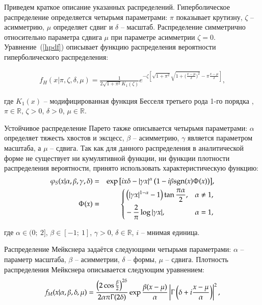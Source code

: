 Приведем краткое описание указанных распределений.
Гиперболическое распределение определяется четырьмя параметрами: $\pi$ показывает крутизну, $\zeta$ -- асимметрию, $\mu$ определяет сдвиг и $\delta$ -- масштаб. 
Распределение симметрично относительно параметра сдвига $\mu$ при параметре асимметрии $\zeta=0$. 
Уравнение~(\ref{hpdf}) описывает функцию распределения вероятности гиперболического распределения:

\begin{eqnarray}\label{hpdf} 
f_H(x|\pi,\zeta,\delta,\mu)=\frac{1}{2 \sqrt{1+\pi^2} 
K_1(\zeta) }e^{-\zeta \left[ \sqrt{1+\pi^2}
\sqrt{1+\big(\frac{x-\mu}{\delta})^2}-
\pi\frac{x-\mu}{\delta}\right]},
\end{eqnarray}

\noindent где $K_1(x)$ -- модифицированная функция Бесселя третьего рода 1-го порядка \cite{Bessel1824}, $\pi \in \mathbb{R}$, $\zeta > 0$, $\delta > 0$, $\mu \in \mathbb{R}$.

Устойчивое распределение Парето также описывается четырьмя параметрами: $\alpha$ определяет тяжесть хвостов и эксцесс, $\beta$ -- асимметрию, $\gamma$ является параметром масштаба, а $\mu$ -- сдвига. Так как для данного распределения в аналитической форме не существует ни кумулятивной функции, ни функции плотности распределения вероятности, принято использовать характеристическую функцию:
%
\begin{eqnarray}\label{StChF} 
\varphi_S(x|\alpha,\beta,\gamma,\delta) &=& \exp{\left[ix\delta-|\gamma x|^\alpha \left(1 - i\beta\text{sgn}(x)\Upphi(x)\right)\right]}, \\
\Upphi(x) &=& \left\{ \begin{aligned}
    & \left(|\gamma x|^{1-\alpha} - 1\right)\tan{\frac{\pi\alpha}{2}}, & & \alpha \ne 1, \\
    & -\frac{2}{\pi}\log{|\gamma x|}, & & \alpha = 1,
\end{aligned} \right. \nonumber
\end{eqnarray}

\noindent где $\alpha \in (0;\ 2]$, $\beta \in [-1;\ 1]$, $\gamma > 0$, $\delta \in \mathbb{R}$, $i$ -- мнимая единица.

Распределение Мейкснера задаётся следующими четырьмя параметрами: $\alpha$ -- параметр масштаба, $\beta$ -- асимметрии, $\delta$ -- формы, $\mu$ -- сдвига. Плотность распределения Мейкснера описывается следующим уравнением:
%
\begin{equation} \label{mpdf}
    f_M(x|\alpha,\beta,\delta,\mu)=\frac{\left(2\cos{\frac{\beta}{2}}\right)^{2\delta}}{2\alpha\pi\Upgamma(2\delta)}\exp{\frac{\beta(x-\mu)}{\alpha}}\left|\Upgamma\left(\delta + i\frac{x-\mu}{\alpha}\right)\right|^2,
\end{equation}

